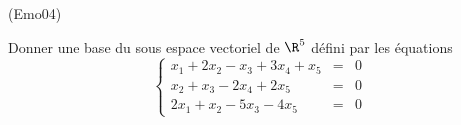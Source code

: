 \begin{tiny}(Emo04)\end{tiny}
Donner une base du sous espace vectoriel de $\R^{5}$ d{\'e}fini par les {\'e}quations
\[
\left\{
\begin{array}{ccc}
x_{1}+2x_{2}-x_{3}+3x_{4}+x_{5} & = & 0 \\
x_{2}+x_{3}-2x_{4}+2x_{5} & = & 0 \\
2x_{1}+x_{2}-5x_{3}-4x_{5} & = & 0
\end{array}
\right.
\]